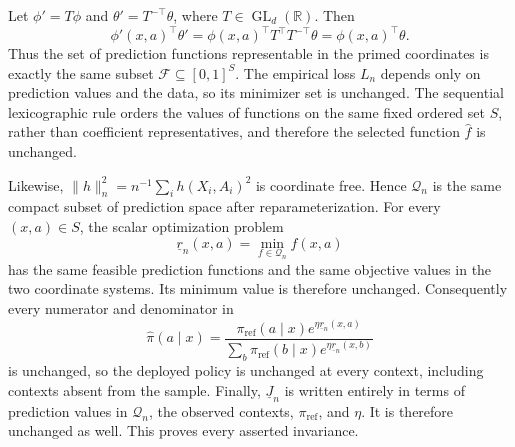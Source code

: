 Let \(\phi'=T\phi\) and \(\theta'=T^{-\top}\theta\), where \(T\in\operatorname{GL}_d(\mathbb R)\). Then
\[
\phi'(x,a)^\top\theta'=\phi(x,a)^\top T^\top T^{-\top}\theta=\phi(x,a)^\top\theta.
\]
Thus the set of prediction functions representable in the primed coordinates is exactly the same subset \(\mathcal F\subseteq[0,1]^S\). The empirical loss \(L_n\) depends only on prediction values and the data, so its minimizer set is unchanged. The sequential lexicographic rule orders the values of functions on the same fixed ordered set \(S\), rather than coefficient representatives, and therefore the selected function \(\widehat f\) is unchanged.

Likewise, \(\|h\|_n^2=n^{-1}\sum_i h(X_i,A_i)^2\) is coordinate free. Hence \(\mathcal Q_n\) is the same compact subset of prediction space after reparameterization. For every \((x,a)\in S\), the scalar optimization problem
\[
\underline r_n(x,a)=\min_{f\in\mathcal Q_n}f(x,a)
\]
has the same feasible prediction functions and the same objective values in the two coordinate systems. Its minimum value is therefore unchanged. Consequently every numerator and denominator in
\[
\widehat\pi(a\mid x)=\frac{\pi_{\mathrm{ref}}(a\mid x)e^{\eta\underline r_n(x,a)}}{\sum_b\pi_{\mathrm{ref}}(b\mid x)e^{\eta\underline r_n(x,b)}}
\]
is unchanged, so the deployed policy is unchanged at every context, including contexts absent from the sample. Finally, \(\underline J_n\) is written entirely in terms of prediction values in \(\mathcal Q_n\), the observed contexts, \(\pi_{\mathrm{ref}}\), and \(\eta\). It is therefore unchanged as well. This proves every asserted invariance.